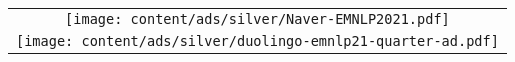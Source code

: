 \thispagestyle{empty}
\thispagestyle{empty}
\begin{center}
\begin{tabular}{c}
  \texttt{[image: content/ads/silver/Naver-EMNLP2021.pdf]} \\
  \texttt{[image: content/ads/silver/duolingo-emnlp21-quarter-ad.pdf]} \\
\end{tabular}
\end{center}


